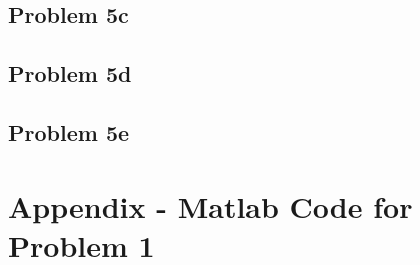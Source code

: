 \subsection*{Problem 5c}

\subsection*{Problem 5d}

\subsection*{Problem 5e}






\newpage
\section{Appendix - Matlab Code for Problem 1}
\label{appendix:problem1}

